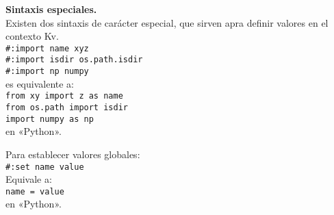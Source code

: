 \textbf{Sintaxis especiales.}\\
Existen dos sintaxis de carácter especial, que sirven apra definir valores en el contexto Kv.\\
\texttt{\#:import name xyz\\
\#:import isdir os.path.isdir\\
\#:import np numpy}\\
es equivalente a:\\
\texttt{from xy import z as name\\
from os.path import isdir\\
import numpy as np}\\
en «Python».

Para establecer valores globales:\\
\texttt{\#:set name value}\\
Equivale a:\\
\texttt{name = value }\\
en «Python».\\





